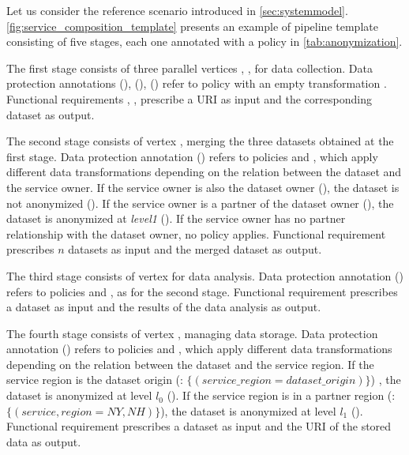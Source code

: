 \begin{example}[\bf \pipelineTemplate]\label{ex:template}
Let us consider the reference scenario introduced in \cref{sec:systemmodel}.
\cref{fig:service_composition_template} presents an example of pipeline template consisting of five stages, each one annotated with a policy in \cref{tab:anonymization}.

The first stage consists of three parallel vertices , ,  for data collection.
Data protection annotations \myLambda(), \myLambda(), \myLambda() refer to policy  with an empty transformation .
Functional requirements , ,   prescribe a URI as input and the corresponding dataset as output.

The second stage consists of vertex , merging the three datasets obtained at the first stage. Data protection annotation \myLambda() refers to policies  and , which apply different data transformations depending on the relation between the dataset and the service owner.
If the service owner is also the dataset owner (\pone), the dataset is not anonymized (). If the service owner is a partner of the dataset owner (\ptwo), the dataset is anonymized at \emph{level1} (). If the service owner has no partner relationship with the dataset owner, no policy applies.
Functional requirement  prescribes $n$ datasets as input and the merged dataset as output.

The third stage consists of vertex   for data analysis.
Data protection annotation \myLambda() refers to policies  and , as for the second stage.
Functional requirement  prescribes a dataset as input and the results of the data analysis as output.


The fourth stage consists of vertex , managing data storage. Data protection annotation \myLambda() refers to policies  and , which apply different data transformations depending on the relation between the dataset and the service region.
If the service region is the dataset origin (: $\{(service\_region=dataset\_origin)\}$) , the dataset is anonymized at level $l_0$ ().
If the service region is in a partner region (: $\{(service,region={NY,NH})\}$), the dataset is anonymized at level $l_1$ ().
Functional requirement  prescribes a dataset as input and the URI of the stored data as output.


\end{example}
